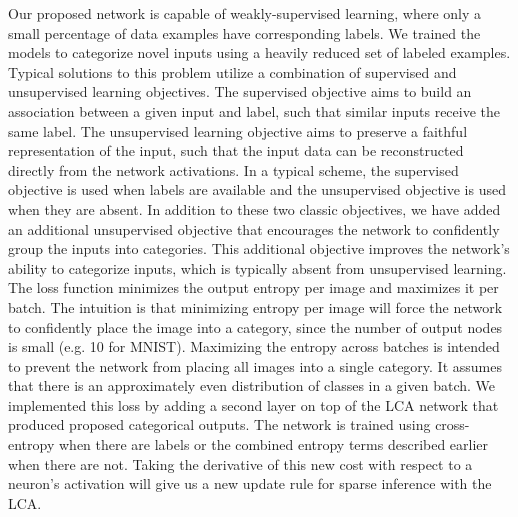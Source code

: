 Our proposed network is capable of weakly-supervised learning, where only a small percentage of data examples have corresponding labels. We trained the models to categorize novel inputs using a heavily reduced set of labeled examples. Typical solutions to this problem utilize a combination of supervised and unsupervised learning objectives. The supervised objective aims to build an association between a given input and label, such that similar inputs receive the same label. The unsupervised learning objective aims to preserve a faithful representation of the input, such that the input data can be reconstructed directly from the network activations. In a typical scheme, the supervised objective is used when labels are available and the unsupervised objective is used when they are absent. In addition to these two classic objectives, we have added an additional unsupervised objective that encourages the network to confidently group the inputs into categories. This additional objective improves the network’s ability to categorize inputs, which is typically absent from unsupervised learning. The loss function minimizes the output entropy per image and maximizes it per batch. The intuition is that minimizing entropy per image will force the network to confidently place the image into a category, since the number of output nodes is small (e.g. 10 for MNIST). Maximizing the entropy across batches is intended to prevent the network from placing all images into a single category. It assumes that there is an approximately even distribution of classes in a given batch. We implemented this loss by adding a second layer on top of the LCA network that produced proposed categorical outputs. The network is trained using cross-entropy when there are labels or the combined entropy terms described earlier when there are not. Taking the derivative of this new cost with respect to a neuron's activation will give us a new update rule for sparse inference with the LCA.


